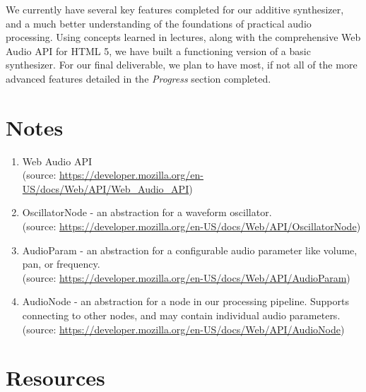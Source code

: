 \documentclass[a4paper, 12pt]{article}
\begin{document}
We currently have several key features completed for our additive synthesizer, and a much better understanding of the foundations of practical audio processing. Using concepts learned in lectures, along with the comprehensive Web Audio API for HTML 5, we have built a functioning version of a basic synthesizer. For our final deliverable, we plan to have most, if not all of the more advanced features detailed in the \emph{Progress} section completed.
\newpage

\section*{Notes}

\begin{enumerate}
\item Web Audio API\\
(source: \url{https://developer.mozilla.org/en-US/docs/Web/API/Web_Audio_API})

\item OscillatorNode - an abstraction for a waveform oscillator.\\
(source: \url{https://developer.mozilla.org/en-US/docs/Web/API/OscillatorNode})

\item AudioParam - an abstraction for a configurable audio parameter like volume, pan, or frequency.\\
(source: \url{https://developer.mozilla.org/en-US/docs/Web/API/AudioParam})

\item AudioNode - an abstraction for a node in our processing pipeline. Supports connecting to other nodes, and may contain individual audio parameters.\\
(source: \url{https://developer.mozilla.org/en-US/docs/Web/API/AudioNode})


\end{enumerate}

\section*{Resources}
\end{document}
